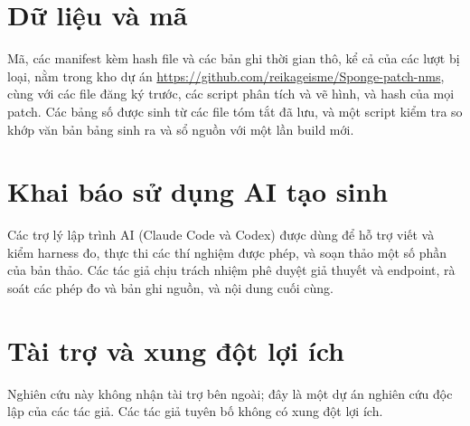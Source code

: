 \documentclass[a4paper,fleqn]{cas-dc}
\begin{document}
\section*{Dữ liệu và mã}
Mã, các manifest kèm hash file và các bản ghi thời gian thô, kể cả của các lượt bị loại, nằm trong kho dự án \url{https://github.com/reikageisme/Sponge-patch-nms}, cùng với các file đăng ký trước, các script phân tích và vẽ hình, và hash của mọi patch. Các bảng số được sinh từ các file tóm tắt đã lưu, và một script kiểm tra so khớp văn bản bảng sinh ra và sổ nguồn với một lần build mới.

\section*{Khai báo sử dụng AI tạo sinh}
Các trợ lý lập trình AI (Claude Code và Codex) được dùng để hỗ trợ viết và kiểm harness đo, thực thi các thí nghiệm được phép, và soạn thảo một số phần của bản thảo. Các tác giả chịu trách nhiệm phê duyệt giả thuyết và endpoint, rà soát các phép đo và bản ghi nguồn, và nội dung cuối cùng.

\section*{Tài trợ và xung đột lợi ích}
Nghiên cứu này không nhận tài trợ bên ngoài; đây là một dự án nghiên cứu độc lập của các tác giả. Các tác giả tuyên bố không có xung đột lợi ích.

\FloatBarrier


\end{document}
